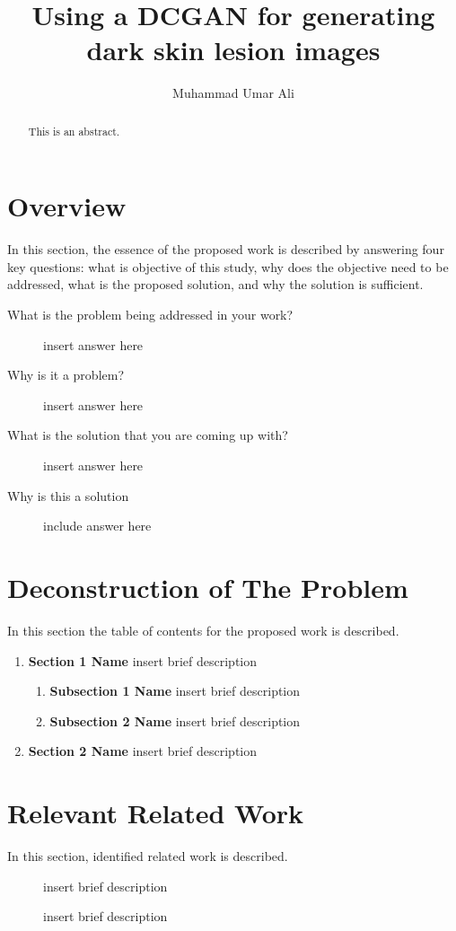 \documentclass[english,10pt]{article}
\title{Using a DCGAN for generating dark skin lesion images}
\author{Muhammad Umar Ali}
\begin{document}
    \maketitle
    \begin{abstract}
        This is an abstract.
    \end{abstract}


    \section{Overview}
    {In this section, the essence of the proposed work is described by answering four key questions: what is objective of this study, why does the objective need to be addressed, what is the proposed solution, and why the solution is sufficient.  }

    \begin{description}
        \item [What is the problem being addressed in your work?]
        {insert answer here}

        \item [Why is it a problem?]{
        insert answer here}

        \item [What is the solution that you are coming up with?]{
        insert answer here}

        \item [Why is this a solution]{
            include answer here
            }
    \end{description}

\section{Deconstruction of The Problem}
{In this section the table of contents for the proposed work is described.}

    \begin{enumerate}
        \item \textbf{Section 1 Name} insert brief description
                \begin{enumerate}
                    \item \textbf{Subsection 1 Name} insert brief description
                    \item \textbf{Subsection 2 Name} insert brief description
                \end{enumerate}
        \item \textbf{Section 2 Name} insert brief description
    \end{enumerate}


    \section{Relevant Related Work}
    {In this section, identified related work is described.}

    \begin{description}
    \item[\cite{gruba_how_2017}] insert brief description
    \item[\cite{zobel_writing_2015}] insert brief description
    \end{description}

  \newpage
  \printbibliography
\end{document}
